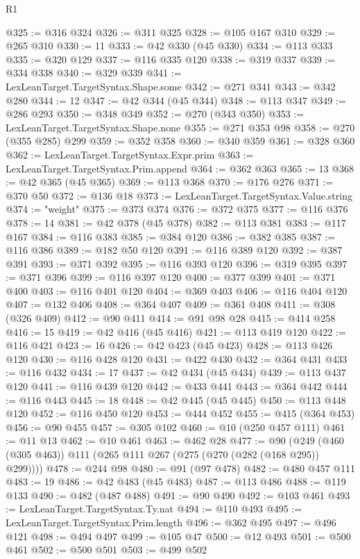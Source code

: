 \begin{lexlean}{R1}
\begin{coremodule}
@325 := @316 @324
@326 := @311 @325
@328 := @105 @167 @310
@329 := @265 @310
@330 := 11
@333 := @42 @330 (@45 @330)
@334 := @113 @333
@335 := @320 @129
@337 := @116 @335 @120
@338 := @319 @337
@339 := @334 @338
@340 := @329 @339
@341 := LexLeanTarget.TargetSyntax.Shape.some
@342 := @271 @341
@343 := @342 @280
@344 := 12
@347 := @42 @344 (@45 @344)
@348 := @113 @347
@349 := @286 @293
@350 := @348 @349
@352 := @270 (@343 @350)
@353 := LexLeanTarget.TargetSyntax.Shape.none
@355 := @271 @353 @98
@358 := @270 (@355 @285) @299
@359 := @352 @358
@360 := @340 @359
@361 := @328 @360
@362 := LexLeanTarget.TargetSyntax.Expr.prim
@363 := LexLeanTarget.TargetSyntax.Prim.append
@364 := @362 @363
@365 := 13
@368 := @42 @365 (@45 @365)
@369 := @113 @368
@370 := @176 @276
@371 := @370 @50
@372 := @136 @18
@373 := LexLeanTarget.TargetSyntax.Value.string
@374 := "weight"
@375 := @373 @374
@376 := @372 @375
@377 := @116 @376
@378 := 14
@381 := @42 @378 (@45 @378)
@382 := @113 @381
@383 := @117 @167
@384 := @116 @383
@385 := @384 @120
@386 := @382 @385
@387 := @116 @386
@389 := @182 @50 @120
@391 := @116 @389 @120
@392 := @387 @391
@393 := @371 @392
@395 := @116 @393 @120
@396 := @319 @395
@397 := @371 @396
@399 := @116 @397 @120
@400 := @377 @399
@401 := @371 @400
@403 := @116 @401 @120
@404 := @369 @403
@406 := @116 @404 @120
@407 := @132 @406
@408 := @364 @407
@409 := @361 @408
@411 := @308 (@326 @409)
@412 := @90 @411
@414 := @91 @98 @28
@415 := @414 @258
@416 := 15
@419 := @42 @416 (@45 @416)
@421 := @113 @419 @120
@422 := @116 @421
@423 := 16
@426 := @42 @423 (@45 @423)
@428 := @113 @426 @120
@430 := @116 @428 @120
@431 := @422 @430
@432 := @364 @431
@433 := @116 @432
@434 := 17
@437 := @42 @434 (@45 @434)
@439 := @113 @437 @120
@441 := @116 @439 @120
@442 := @433 @441
@443 := @364 @442
@444 := @116 @443
@445 := 18
@448 := @42 @445 (@45 @445)
@450 := @113 @448 @120
@452 := @116 @450 @120
@453 := @444 @452
@455 := @415 (@364 @453)
@456 := @90 @455
@457 := @305 @102
@460 := @10 (@250 @457 @111)
@461 := @11 @13
@462 := @10 @461
@463 := @462 @28
@477 := @90 (@249 (@460 (@305 @463)) @111 (@265 @111 @267 (@275 (@270 (@282 (@168 @295)) @299))))
@478 := @244 @98
@480 := @91 (@97 @478)
@482 := @480 @457 @111
@483 := 19
@486 := @42 @483 (@45 @483)
@487 := @113 @486
@488 := @119 @133
@490 := @482 (@487 @488)
@491 := @90 @490
@492 := @103 @461
@493 := LexLeanTarget.TargetSyntax.Ty.nat
@494 := @110 @493
@495 := LexLeanTarget.TargetSyntax.Prim.length
@496 := @362 @495
@497 := @496 @121
@498 := @494 @497
@499 := @105 @47
@500 := @12 @493
@501 := @500 @461
@502 := @500 @501
@503 := @499 @502

\end{coremodule}
\end{lexlean}
